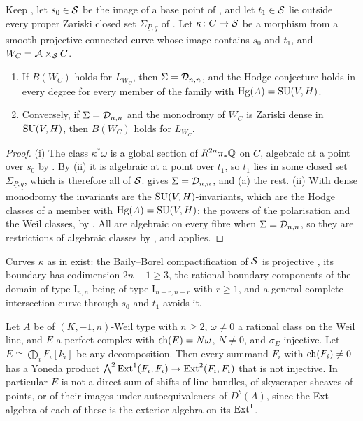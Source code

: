 \begin{corollary}
\label{cor:weilequiv}
Keep , let $s_{0}\in\mathcal{S}$ be the image of a base point of
, and let $t_{1}\in\mathcal{S}$ lie outside every proper
Zariski closed set $\Sigma_{\underline{P},\underline{q}}$ of
. Let $\kappa\colon C\to\mathcal{S}$ be a morphism from a smooth
projective connected curve whose image contains $s_{0}$ and $t_{1}$, and
$W_{C}=\mathcal{A}\times_{\mathcal{S}}C$.
\begin{enumerate}[label=\textup{(\roman*)},leftmargin=2.6em,itemsep=2pt]
\item If $B(W_{C})$ holds for $L_{W_{C}}$, then $\Sigma=\mathcal{D}_{n,n}$, and the
  Hodge conjecture holds in every degree for every member of the family with
  $\operatorname{Hg}(A)=\operatorname{SU}(V,H)$.
\item Conversely, if $\Sigma=\mathcal{D}_{n,n}$ and the monodromy of $W_{C}$ is Zariski
  dense in $\operatorname{SU}(V,H)$, then $B(W_{C})$ holds for $L_{W_{C}}$.
\end{enumerate}
\end{corollary}

\begin{proof}
(i) The class $\kappa^{*}\omega$ is a global section of
$R^{2n}\pi_{*}\mathbb{Q}$ on $C$, algebraic at a point over $s_{0}$ by
. By (ii) it is algebraic
at a point over $t_{1}$, so $t_{1}$ lies in some closed set
$\Sigma_{\underline{P},\underline{q}}$, which is therefore all of $\mathcal{S}$.
 gives $\Sigma=\mathcal{D}_{n,n}$, and (a)
the rest. (ii) With dense monodromy the invariants are the
$\operatorname{SU}(V,H)$-invariants, which are the Hodge classes of a member with
$\operatorname{Hg}(A)=\operatorname{SU}(V,H)$: the powers of the polarisation and the Weil classes, by
. All are algebraic on every fibre when
$\Sigma=\mathcal{D}_{n,n}$, so they are restrictions of algebraic classes by
, and  applies.
\end{proof}

Curves $\kappa$ as in  exist: the Baily--Borel
compactification of $\mathcal{S}$ is projective \cite{BB66}, its boundary has
codimension $2n-1\ge3$, the rational boundary components of the domain of type
$\mathrm{I}_{n,n}$ being of type $\mathrm{I}_{n-r,n-r}$ with $r\ge1$, and a
general complete intersection curve through $s_{0}$ and $t_{1}$ avoids it.

\begin{theorem}\label{thm:nosum}
Let $A$ be of $(K,-1,n)$-Weil type with $n\ge2$, $\omega\ne0$ a rational class
on the Weil line, and $E$ a perfect complex with $\operatorname{ch}(E)=N\omega$, $N\ne0$, and
$\sigma_{E}$ injective. Let
$E\cong\bigoplus_{i}F_{i}[k_{i}]$ be any decomposition. Then every summand
$F_{i}$ with $\operatorname{ch}(F_{i})\ne0$ has a Yoneda product
$\bigwedge^{2}\operatorname{Ext}^{1}(F_{i},F_{i})\to\operatorname{Ext}^{2}(F_{i},F_{i})$ that is not
injective. In particular $E$ is not a direct sum of shifts of line bundles,
of skyscraper sheaves of points, or of their images under autoequivalences of
$D^{b}(A)$, since the Ext algebra of each of these is the exterior algebra on
its $\operatorname{Ext}^{1}$.
\end{theorem}

